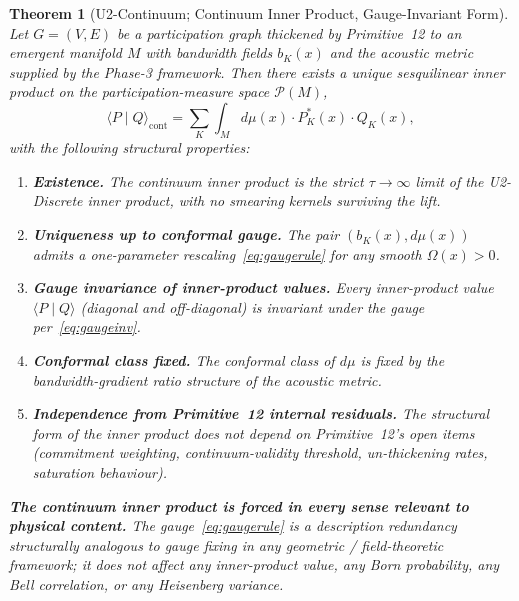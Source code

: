 \documentclass[11pt,a4paper]{article}
\newtheorem{theorem}{Theorem}[section]
\begin{document}
\begin{theorem}[U2-Continuum; Continuum Inner Product, Gauge-Invariant Form]
Let $G = (V, E)$ be a participation graph thickened by Primitive~12 to an emergent manifold $M$ with bandwidth fields $b_K(x)$ and the acoustic metric supplied by the Phase-3 framework. Then there exists a unique sesquilinear inner product on the participation-measure space $\mathcal{P}(M)$,
\begin{equation}
\langle P \mid Q \rangle_\mathrm{cont} = \sum_K \int_M d\mu(x) \cdot P_K^*(x) \cdot Q_K(x),
\label{eq:thmcontinuum}
\end{equation}
with the following structural properties:
\begin{enumerate}
  \item \textbf{Existence.} The continuum inner product is the strict $\tau \to \infty$ limit of the U2-Discrete inner product, with no smearing kernels surviving the lift.
  \item \textbf{Uniqueness up to conformal gauge.} The pair $(b_K(x), d\mu(x))$ admits a one-parameter rescaling~\eqref{eq:gaugerule} for any smooth $\Omega(x) > 0$.
  \item \textbf{Gauge invariance of inner-product values.} Every inner-product value $\langle P \mid Q \rangle$ (diagonal and off-diagonal) is invariant under the gauge per~\eqref{eq:gaugeinv}.
  \item \textbf{Conformal class fixed.} The conformal class of $d\mu$ is fixed by the bandwidth-gradient ratio structure of the acoustic metric.
  \item \textbf{Independence from Primitive~12 internal residuals.} The structural form of the inner product does not depend on Primitive~12's open items (commitment weighting, continuum-validity threshold, un-thickening rates, saturation behaviour).
\end{enumerate}
\textbf{The continuum inner product is forced in every sense relevant to physical content.} The gauge~\eqref{eq:gaugerule} is a description redundancy structurally analogous to gauge fixing in any geometric / field-theoretic framework; it does not affect any inner-product value, any Born probability, any Bell correlation, or any Heisenberg variance.
\end{theorem}
\end{document}
